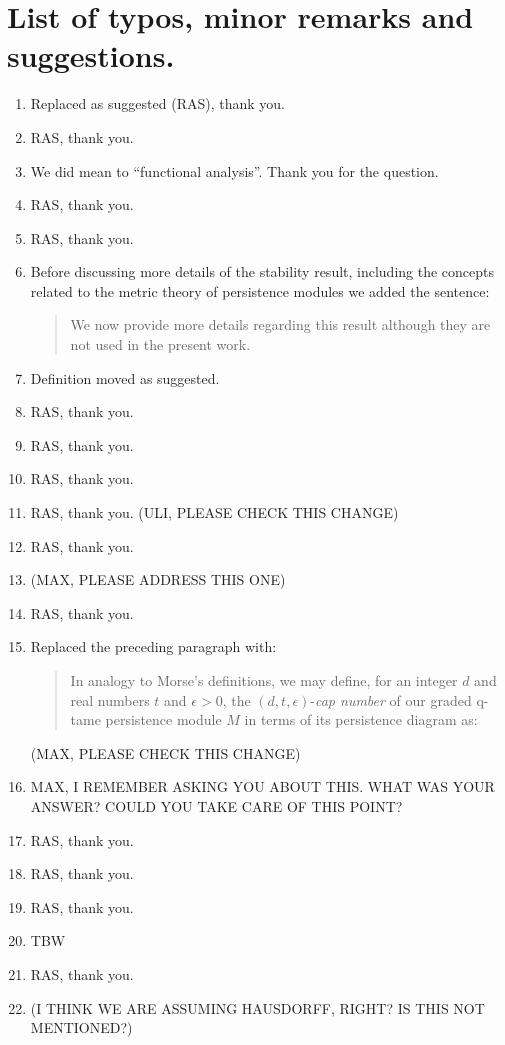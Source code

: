 \documentclass{article}
\begin{document}
	\section{List of typos, minor remarks and suggestions.}
	\begin{enumerate}
		\item Replaced as suggested (RAS), thank you.
		\item RAS, thank you.
		\item We did mean to ``functional analysis''. Thank you for the question.
		\item RAS, thank you.
		\item RAS, thank you.
		\item Before discussing more details of the stability result, including the concepts related to the metric theory of persistence modules we added the sentence:
		\begin{quote}
			We now provide more details regarding this result although they are not used in the present work.
		\end{quote}
		\item Definition moved as suggested.
		\item RAS, thank you.
		\item RAS, thank you.
		\item RAS, thank you.
		\item RAS, thank you. (ULI, PLEASE CHECK THIS CHANGE)
		\item RAS, thank you.
		\item (MAX, PLEASE ADDRESS THIS ONE)
		\item RAS, thank you.
		\item Replaced the preceding paragraph with:
		\begin{quote}
			In analogy to Morse's definitions, we may define, for an integer $d$ and real numbers $t$ and $\epsilon > 0$, the $(d, t, \epsilon)$-\emph{cap number} of our graded q-tame persistence module $M$ in terms of its persistence diagram as:
		\end{quote}
		(MAX, PLEASE CHECK THIS CHANGE)
		\item MAX, I REMEMBER ASKING YOU ABOUT THIS. WHAT WAS YOUR ANSWER? COULD YOU TAKE CARE OF THIS POINT?
		\item RAS, thank you.
		\item RAS, thank you.
		\item RAS, thank you.
		\item TBW
		\item RAS, thank you.
		\item (I THINK WE ARE ASSUMING HAUSDORFF, RIGHT? IS THIS NOT MENTIONED?)

\end{enumerate}
\end{document}
